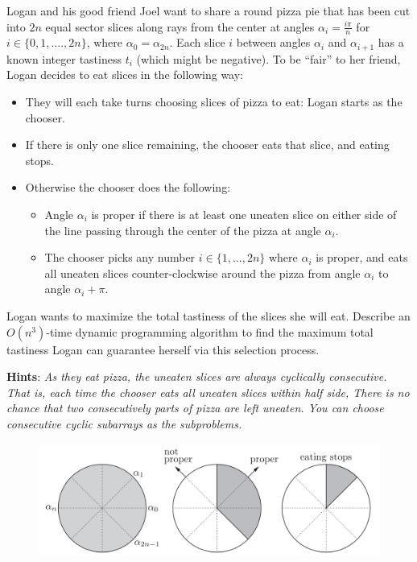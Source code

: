 
Logan and his good friend Joel want to share a round pizza pie that has been cut into $2n$ equal sector slices along rays from the center at angles $\alpha_i = \frac{i\pi}{n}$ for $i \in \{0,1,...., 2n\}$, where $\alpha_0 = \alpha_{2n}$. Each slice $i$ between angles $\alpha_i$ and $\alpha_{i+1}$ has a known integer tastiness $t_i$ (which might be negative). To be “fair” to her friend, Logan decides to eat slices in the following way:
\begin{itemize}
    \item They will each take turns choosing slices of pizza to eat: Logan starts as the chooser.
    \item If there is only one slice remaining, the chooser eats that slice, and eating stops.
    \item Otherwise the chooser does the following:
    \begin{itemize}
        \item Angle $\alpha_i$ is proper if there is at least one uneaten slice on either side of the line passing
through the center of the pizza at angle $\alpha_i$.
        \item The chooser picks any number $i \in \{1,...,2n\}$ where $\alpha_i$ is proper, and eats all uneaten slices counter-clockwise around the pizza from angle $\alpha_i$ to angle $\alpha_i + \pi$.
    \end{itemize}
\end{itemize}

Logan wants to maximize the total tastiness of the slices she will eat. Describe an $O(n^3)$-time dynamic programming algorithm
to find the maximum total tastiness Logan can guarantee herself via this selection process. 

\textbf{Hints}: \textit{As they eat pizza, the uneaten slices are always cyclically consecutive. That is, each time the chooser eats all uneaten slices within half side, There is no chance that two consecutively parts of pizza are left uneaten. You can choose consecutive cyclic subarrays as the subproblems.}

\begin{figure}[htbp]
    \centering
    \includegraphics[width=1\linewidth]{p6.png}
\end{figure}

